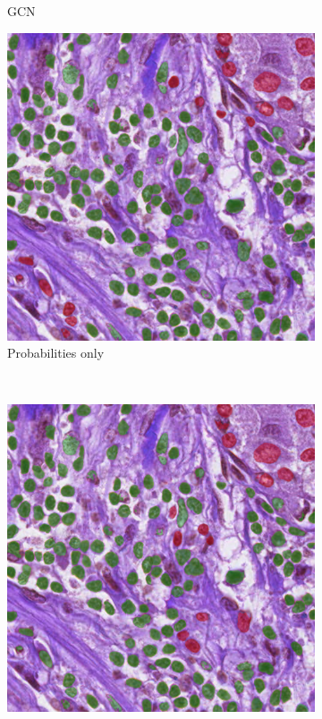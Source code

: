 \begin{figure}[H]
\begin{subfigure}[b]{0.45\textwidth}
    \caption{GCN}
    \label{fig:monusac-gcn1}
  \end{subfigure}
  \hfill
  \begin{subfigure}[b]{0.45\textwidth}
    \includegraphics[width=\textwidth]{imgs/qual/monusac/no-morph1.png}
    \caption{Probabilities only}
    \label{fig:monusac-no-morph1}
  \end{subfigure}
  \\
  \begin{subfigure}[b]{0.45\textwidth}
    \includegraphics[width=\textwidth]{imgs/qual/monusac/no-prior1.png}

\end{subfigure}
\end{figure}
